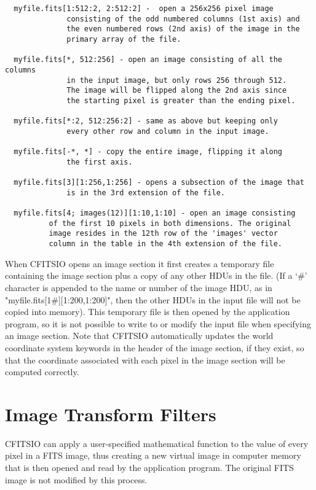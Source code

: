 \documentclass[11pt]{book}
\begin{document}
\begin{verbatim}
  myfile.fits[1:512:2, 2:512:2] -  open a 256x256 pixel image
              consisting of the odd numbered columns (1st axis) and
              the even numbered rows (2nd axis) of the image in the
              primary array of the file.

  myfile.fits[*, 512:256] - open an image consisting of all the columns
              in the input image, but only rows 256 through 512.
              The image will be flipped along the 2nd axis since
              the starting pixel is greater than the ending pixel.

  myfile.fits[*:2, 512:256:2] - same as above but keeping only
              every other row and column in the input image.

  myfile.fits[-*, *] - copy the entire image, flipping it along
              the first axis.

  myfile.fits[3][1:256,1:256] - opens a subsection of the image that
              is in the 3rd extension of the file.

  myfile.fits[4; images(12)][1:10,1:10] - open an image consisting
	      of the first 10 pixels in both dimensions. The original
	      image resides in the 12th row of the 'images' vector
	      column in the table in the 4th extension of the file.
\end{verbatim}

When CFITSIO opens an image section it first creates a temporary file
containing the image section plus a copy of any other HDUs in the
file. (If a `\#' character is appended to the name or number of the
image HDU, as in  "myfile.fits[1\#][1:200,1:200]", then the other
HDUs in the input file will not be copied into memory).
This temporary file is then opened by the application program,
so it is not possible to write to or modify the input file when
specifying an image section.  Note that CFITSIO automatically updates
the world coordinate system keywords in the header of the image
section, if they exist, so that the coordinate associated with each
pixel in the image section will be computed correctly.


\section{Image Transform Filters}

CFITSIO can apply a user-specified mathematical function to the value
of every pixel in a FITS image, thus creating a new virtual image
in computer memory that is then opened and read by the application
program.  The original FITS image is not modified by this process.
\end{document}
